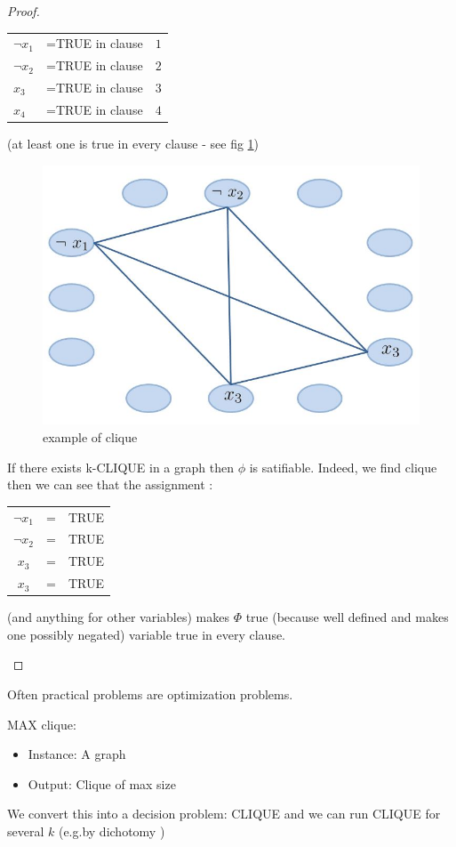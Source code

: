 \begin{proof}
\begin{itemize}
\begin{center}
\begin{tabular}{lll}
$\neg x_1$ &=TRUE in clause & $1$ \\$\neg x_2$ &=TRUE in clause & $2$ \\ $ x_3$ &=TRUE in clause & $3$ \\ $x_4$ &=TRUE in clause & $4$
\end{tabular}
\end{center}

(at least one is true in every clause - see fig \ref{c12:clique2})

\begin{figure}[h!!]
\centering
\includegraphics[scale=0.45]{images/fig_4.jpg}
\caption{example of clique}
\label{c12:clique2}
\end{figure}

If there exists k-CLIQUE in a graph then $\phi$ is satifiable.
 Indeed, we find clique then we can see that the assignment : \\
 
 \begin{center}
\begin{tabular}{ccc}
$ \neg x_1$ & =& TRUE \\
$\neg x_2$ & =& TRUE \\
 $x_3$ & =& TRUE \\
 $x_3$ & =& TRUE \\
\end{tabular}
\end{center}
(and anything for other variables) makes $\Phi$ true (because well defined and makes one possibly negated) variable true in every clause.\\
\end{itemize}
\end{proof}

Often practical problems are optimization problems.\\

\begin{definition}
MAX clique:
\begin{itemize}
\item Instance: A graph
\item Output:  Clique of max size
\end{itemize}

We convert this into a decision problem: CLIQUE and we can run CLIQUE for several $k$ (e.g.by dichotomy )
\end{definition}